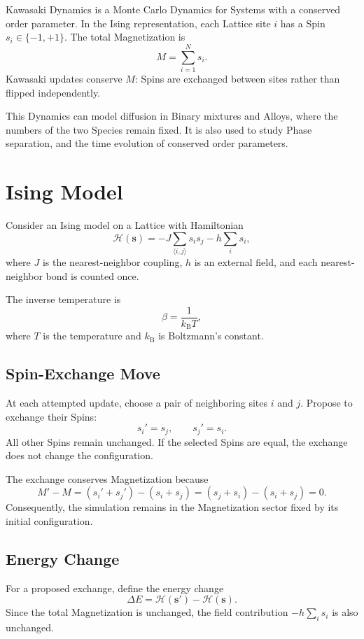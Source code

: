 \documentclass[a4paper, 10pt, onepage]{elegantbook}
\begin{document}
{Kawasaki Dynamics is a Monte Carlo Dynamics for Systems with a conserved
order parameter. In the Ising representation, each Lattice site \(i\)
has a Spin \(s_i\in\{-1,+1\}\). The total Magnetization is
\[
  M = \sum_{i=1}^{N} s_i.
\]
Kawasaki updates conserve \(M\): Spins are exchanged between sites
rather than flipped independently.

This Dynamics can model diffusion in Binary mixtures and Alloys, where
the numbers of the two Species remain fixed. It is also used to study
Phase separation, and the time evolution of conserved order parameters.

\section{Ising Model}

Consider an Ising model on a Lattice with Hamiltonian
\[
  \mathcal{H}(\mathbf{s})
  =
  -J\sum_{\langle i,j\rangle}s_i s_j
  -h\sum_i s_i,
\]
where \(J\) is the nearest-neighbor coupling, \(h\) is an external
field, and each nearest-neighbor bond is counted once.

The inverse temperature is
\[
  \beta = \frac{1}{k_{\mathrm B}T},
\]
where \(T\) is the temperature and \(k_{\mathrm B}\) is Boltzmann's
constant.

\subsection{Spin-Exchange Move}

At each attempted update, choose a pair of neighboring sites \(i\) and
\(j\). Propose to exchange their Spins:
\[
  s_i' = s_j,
  \qquad
  s_j' = s_i.
\]
All other Spins remain unchanged. If the selected Spins are equal, the
exchange does not change the configuration.

The exchange conserves Magnetization because
\[
  M'-M
  = (s_i'+s_j')-(s_i+s_j)
  = (s_j+s_i)-(s_i+s_j)
  = 0.
\]
Consequently, the simulation remains in the Magnetization sector fixed
by its initial configuration.

\subsection{Energy Change}

For a proposed exchange, define the energy change
\[
  \Delta E
  =
  \mathcal{H}(\mathbf{s}')-\mathcal{H}(\mathbf{s}).
\]
Since the total Magnetization is unchanged, the field contribution
\(-h\sum_i s_i\) is also unchanged.

}
\end{document}
